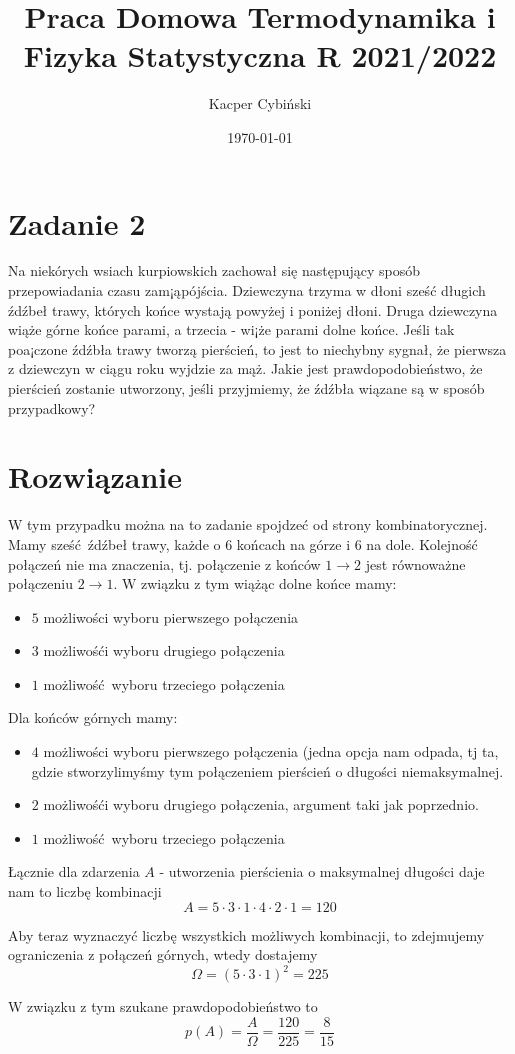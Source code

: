 \documentclass[12pt,a4paper]{article}
\title{Praca Domowa Termodynamika i Fizyka Statystyczna R 2021/2022}
\author{Kacper Cybiński}
\date{\today}
\begin{document}
\maketitle

\section{Zadanie 2}


Na niekórych wsiach kurpiowskich zachował się następujący sposób przepowiadania czasu zam¡ąpójścia. Dziewczyna trzyma w dłoni sześć długich źdźbeł trawy, których końce wystają powyżej i poniżej dłoni. Druga dziewczyna wiąże górne końce parami, a trzecia - wi¡że parami dolne końce. Jeśli tak poa¡czone źdźbła trawy tworzą pierścień, to jest to niechybny sygnał, że pierwsza z dziewczyn w ciągu roku wyjdzie za mąż. Jakie jest prawdopodobieństwo, że pierścień zostanie utworzony, jeśli przyjmiemy, że źdźbła wiązane są w sposób przypadkowy?


\section{Rozwiązanie}

W tym przypadku można na to zadanie spojdzeć od strony kombinatorycznej. Mamy sześć źdźbeł trawy, każde o 6 końcach na górze i 6 na dole. Kolejność połączeń nie ma znaczenia, tj. połączenie z końców $1 \to 2$ jest równoważne połączeniu $2\to 1$. W związku z tym wiążąc dolne końce mamy:
\begin{itemize}
    \item $5$ możliwości wyboru pierwszego połączenia 
    \item $3$ możliwośći wyboru drugiego połączenia
    \item $1$ możliwość wyboru trzeciego połączenia
\end{itemize}
Dla końców górnych mamy:
\begin{itemize}
    \item $4$ możliwości wyboru pierwszego połączenia (jedna opcja nam odpada, tj ta, gdzie stworzylimyśmy tym połączeniem pierścień o długości niemaksymalnej.
    \item $2$ możliwośći wyboru drugiego połączenia, argument taki jak poprzednio.
    \item $1$ możliwość wyboru trzeciego połączenia
\end{itemize}
Łącznie dla zdarzenia $A$ - utworzenia pierścienia o maksymalnej długości daje nam to liczbę kombinacji $$A = 5 \cdot 3 \cdot 1 \cdot 4 \cdot 2 \cdot 1 = 120$$

Aby teraz wyznaczyć liczbę wszystkich możliwych kombinacji, to zdejmujemy ograniczenia z połączeń górnych, wtedy dostajemy $$\Omega = (5 \cdot 3 \cdot 1)^2 = 225$$

W związku z tym szukane prawdopodobieństwo to
\[
    p(A) = \frac{A}{\Omega} = \frac{120}{225} = \frac{8}{15}
\]
\end{document}
